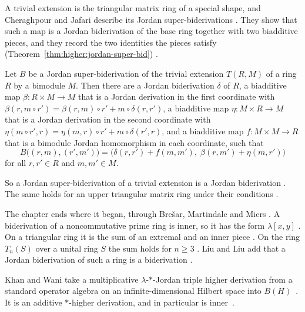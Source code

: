 A trivial extension is the triangular matrix ring of a special shape, and
Cheraghpour and Jafari describe its Jordan super-biderivations
\cite[p.~1]{CheraghpourJafari2024}. They show that such a map is a Jordan
biderivation of the base ring together with two biadditive pieces, and they record
the two identities the pieces satisfy (Theorem~\ref{thm:higher:jordan-super-bid})
\cite[Theorem~2.6, p.~9]{CheraghpourJafari2024}.\begin{theorem}\label{thm:higher:jordan-super-bid}
Let $B$ be a Jordan super-biderivation of the trivial extension $T(R,M)$ of a ring
$R$ by a bimodule $M$. Then there are a Jordan biderivation $\delta$ of $R$, a
biadditive map $\beta\colon R\times M\to M$ that is a Jordan derivation in the
first coordinate with
$\beta(r,m\circ r')=\beta(r,m)\circ r'+m\circ\delta(r,r')$, a biadditive map
$\eta\colon M\times R\to M$ that is a Jordan derivation in the second coordinate
with $\eta(m\circ r',r)=\eta(m,r)\circ r'+m\circ\delta(r',r)$, and a biadditive map
$f\colon M\times M\to R$ that is a bimodule Jordan homomorphism in each coordinate,
such that
\[
B\bigl((r,m),(r',m')\bigr)=\bigl(\delta(r,r')+f(m,m'),\;\beta(r,m')+\eta(m,r')\bigr)
\]
for all $r,r'\in R$ and $m,m'\in M$.
\end{theorem}

So a Jordan super-biderivation of a trivial extension is a Jordan biderivation
\cite[p.~1]{CheraghpourJafari2024}. The same holds for an upper triangular
matrix ring under their conditions \cite[p.~1]{CheraghpourJafari2024}.

The chapter ends where it began, through Brešar, Martindale and Miers
\cite[p.~1952]{Wang2016Bideriv}. A biderivation of a noncommutative prime
ring is inner, so it has the form $\lambda[x,y]$
\cite[p.~1952]{Wang2016Bideriv}. On a triangular ring it is the sum of an
extremal and an inner piece \cite[p.~1956]{Wang2016Bideriv}. On the ring
$T_n(S)$ over a unital ring $S$ the sum holds for $n\geq 3$
\cite[p.~1956]{Wang2016Bideriv}. Liu and Liu add that a Jordan
biderivation of such a ring is a biderivation
\cite[p.~1417]{Liu2021JordanBid}.

Khan and Wani take a multiplicative $\lambda$-$*$-Jordan triple higher
derivation from a standard operator algebra on an infinite-dimensional Hilbert
space into $B(H)$~\cite{WlMultiplicativeLambdaJordanTrip2021}. It is an additive $*$-higher derivation, and in particular
is
inner~\cite{WlMultiplicativeLambdaJordanTrip2021}.
